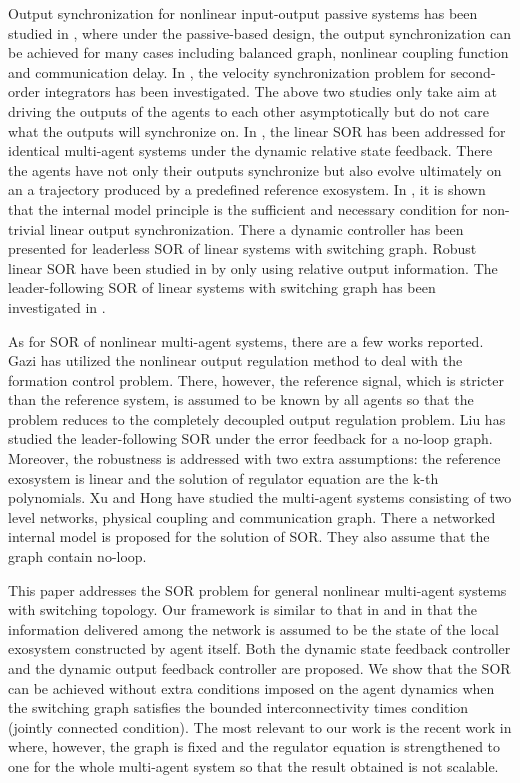 \documentclass[onecolumn,a4paper,12pt]{article}
\numberwithin{equation}{section}
\begin{document}
Output synchronization for nonlinear input-output passive systems has been studied in \cite{ChopraBK2006}, where under the passive-based design, the output synchronization can be achieved for many cases including balanced graph, nonlinear coupling function and communication delay. In \cite{XiaoSCL2010}, the velocity synchronization problem for second-order integrators has been investigated. The above two studies only take aim at driving the outputs of the agents to each other asymptotically but do not care what the outputs will synchronize on. In \cite{XiangTAC2009}, the linear SOR has been addressed for identical multi-agent systems under the dynamic relative state feedback. There the agents have not only their outputs synchronize but also evolve ultimately on an a trajectory produced by a predefined reference exosystem. In \cite{WielandAU2011}, it is shown that the internal model principle is the sufficient and necessary condition for non-trivial linear output synchronization. There a dynamic controller has been presented for leaderless SOR of linear systems with switching graph. Robust linear SOR have been studied in \cite{WangTAC2010} \cite{KimTAC2011} by only using relative output information. The leader-following SOR of linear systems with switching graph has been investigated in \cite{SuTSMCB2012}.

As for SOR of nonlinear multi-agent systems, there are a few works reported. Gazi \cite{GaziIJC2005} has utilized the nonlinear output regulation method to deal with the formation control problem. There, however, the reference signal, which is stricter than the reference system, is assumed to be known by all agents so that the problem reduces to the completely decoupled output regulation problem. Liu \cite{LiuIETCTA2012} has studied the leader-following SOR under the error feedback for a no-loop graph. Moreover, the robustness is addressed with two extra assumptions: the reference exosystem is linear and the solution of regulator equation are the k-th  polynomials. Xu and Hong \cite{XuCCC2012} have studied the multi-agent systems consisting of two level networks, physical coupling and communication graph. There a networked internal model is proposed for the solution of SOR. They also assume that the graph contain no-loop.

This paper addresses the SOR problem for general nonlinear multi-agent systems with switching topology. Our framework is similar to that in \cite{WielandAU2011} and \cite{SuTSMCB2012} in that the information delivered among the network is assumed to be the state of the local exosystem constructed by agent itself. Both the dynamic state feedback controller and the dynamic output feedback controller are proposed. We show that the SOR can be achieved without extra conditions imposed on the agent dynamics when the switching graph satisfies the bounded interconnectivity times condition (jointly connected condition). The most relevant to our work is the recent work in \cite{LiuND2012} where, however, the graph is fixed and the regulator equation is strengthened to one for the whole multi-agent system so that the result obtained is not scalable.
\end{document}
